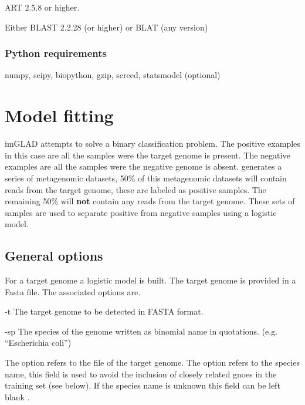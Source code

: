 \documentclass[letterpaper,10pt,english]{sphinxmanual}
\begin{document}
ART 2.5.8 or higher.

Either BLAST 2.2.28 (or higher) or BLAT (any version)


\subsubsection{Python requirements}
\label{introduction:python-requirements}
numpy, scipy, biopython, gzip, screed, statsmodel (optional)


\section{Model fitting}
\label{fitModel:model-fitting}\label{fitModel::doc}
imGLAD attempts to solve a binary classification problem. The positive examples in this case are all the samples were the target genome is present. The negative examples are all the samples were the negative genome is absent.  generates a series of metagenomic datasets, 50\% of this metagenomic datasets will contain reads from the target genome, these are labeled as positive samples.  The remaining 50\% will \textbf{not} contain any reads from the target genome. These sets of samples are used to separate positive from negative samples using a logistic model.


\subsection{General options}
\label{fitModel:general-options}
For a target genome a logistic model is built. The target genome is provided in a Fasta file. The associated options are.
\begin{optionlist}{3cm}
\item [-t]  
The target genome to be detected in FASTA format.
\item [-sp]  
The species of the genome written as binomial name in quotations. (e.g. ``Escherichia coli'')
\end{optionlist}

The option  refers to the file of the target genome. The option  refers to the species name, this field is used to avoid the inclusion of closely related gnoes in the training set (see below). If the species name is unknown this field can be left blank .
\end{document}
